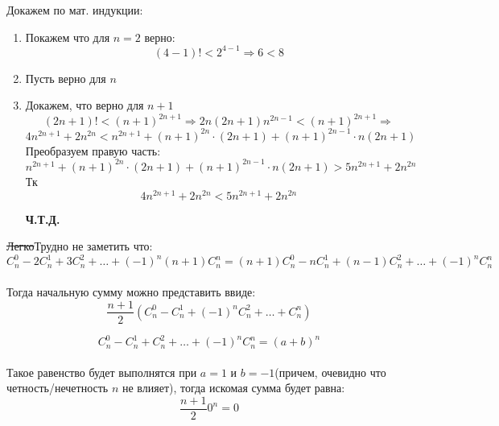 \documentclass{report}
\begin{document}
\sol
Докажем по мат. индукции:
\begin{enumerate}
	\item Покажем что для $n=2$ верно: \\
		\begin{equation*}
			(4-1)!<2^{4-1} \Rightarrow 6<8
		\end{equation*}

	\item Пусть верно для $n$ \\
	\item Докажем, что верно для $n+1$ \\
		\begin{equation*}
			(2n+1)!<(n+1)^{2n+1} \Rightarrow 2n(2n+1)n^{2n-1}<(n+1)^{2n+1} \Rightarrow 
		\end{equation*}
		\begin{equation*}
			4n^{2n+1}+2n^{2n}<n^{2n+1}+(n+1)^{2n}\cdot(2n+1)+(n+1)^{2n-1}\cdot n(2n+1)
		\end{equation*}
		Преобразуем правую часть:
		\begin{equation*}
			n^{2n+1}+(n+1)^{2n}\cdot(2n+1)+(n+1)^{2n-1}\cdot n(2n+1)>5n^{2n+1}+2n^{2n}
		\end{equation*}
		Тк
		\begin{equation*}
			4n^{2n+1}+2n^{2n}<5n^{2n+1}+2n^{2n}
		\end{equation*}
		\begin{center}
		\textbf{Ч.Т.Д.}
		\end{center}
\end{enumerate}

\sol
\sout{Легко}Трудно не заметить что:\\

\begin{equation*}
C_n^0-2C_n^1+3C_n^2+\ldots+(-1)^n(n+1)C_n^n=(n+1)C_n^0-nC_n^1+(n-1)C_n^2+\ldots+(-1)^nC_n^n
\end{equation*}
\\
Тогда начальную сумму можно представить ввиде:
\begin{equation*}
\dfrac{n+1}{2}(C_n^0-C_n^1+(-1)^nC_n^2+\ldots+C_n^n)
\end{equation*}

\begin{equation*}
C_n^0-C_n^1+C_n^2+\ldots+(-1)^nC_n^n=(a+b)^n
\end{equation*}
\\
Такое равенство будет выполнятся при $a=1$ и $b=-1$(причем, очевидно что четность/нечетность $n$ не влияет), тогда искомая сумма будет равна:
\begin{equation*}
\dfrac{n+1}{2}0^n=0
\end{equation*}
\end{document}
